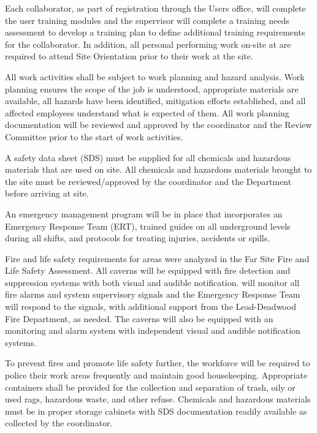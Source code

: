 Each  collaborator, as part of registration through the \fnal Users office,
will complete the user  training modules and the supervisor
will complete a training needs assessment to develop a training plan
to define additional   training requirements for the collaborator.
In addition, all personal performing work on-site at  are required to
attend   Site Orientation prior to their work at the site.


All work activities
shall be subject to work planning and hazard analysis. 
Work planning ensures the scope of
the job is understood, appropriate materials are available, all
hazards have been identified, mitigation efforts established, and all
affected employees understand what is expected of them.   
All work planning documentation will be reviewed and
approved by the   coordinator and the 
 Review Committee prior to the start of work activities.

A safety data sheet (SDS) must be supplied for all chemicals and
hazardous materials that are used on site. All chemicals and hazardous
materials brought to the  site must be reviewed/approved by the
  coordinator and the  
Department before arriving at site.

An emergency management program will be in place that incorporates an Emergency 
Response Team (ERT),  trained guides on all underground levels during all shifts, and protocols for treating injuries, accidents or spills.

Fire and life safety requirements for  areas
were analyzed in the  Far Site Fire and Life
Safety Assessment. All caverns will be equipped with fire detection
and suppression systems with both visual and audible notification.  
 will monitor all fire alarms and system supervisory signals and the  Emergency Response Team
will respond to the signals, with additional support from the Lead-Deadwood Fire
Department, as needed.  The caverns will also be equipped
with an  monitoring and alarm system with independent visual and
audible notification systems.

To prevent fires and promote life safety further, the workforce will be required to  
police their work areas frequently and maintain good housekeeping. 
Appropriate containers shall be provided for the collection and separation
of trash, oily or used rags, hazardous waste, and other refuse.
Chemicals and hazardous materials must be in proper storage cabinets
with SDS documentation readily available as collected by the
  coordinator.  

